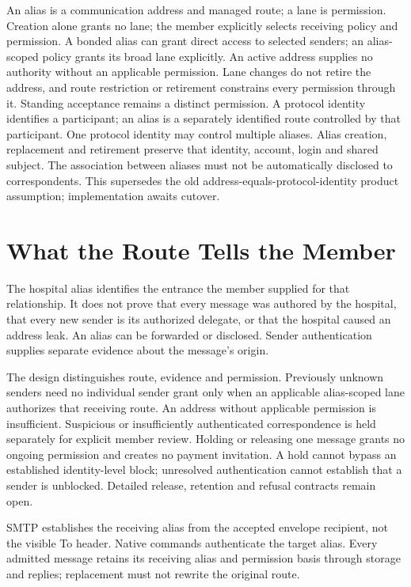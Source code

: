 \documentclass[11pt]{article}
\begin{document}
An alias is a communication address and managed route; a lane is permission.
Creation alone grants no lane; the member explicitly selects receiving policy
and permission. A bonded alias can grant direct access to selected senders;
an alias-scoped policy grants its broad lane explicitly. An active address supplies no authority
without an applicable permission. Lane changes do not retire the address, and
route restriction or retirement constrains every permission through it.
Standing acceptance remains a distinct permission. A protocol identity identifies a participant; an alias is a separately identified
route controlled by that participant. One protocol identity may control multiple
aliases. Alias creation, replacement and retirement preserve that identity,
account, login and shared subject. The association between aliases must not
be automatically disclosed to correspondents. This supersedes the old
address-equals-protocol-identity product assumption; implementation awaits cutover.

\section{What the Route Tells the Member}

The hospital alias identifies the entrance the member supplied for that
relationship. It does not prove that every message was authored by the hospital,
that every new sender is its authorized delegate, or that the hospital caused an
address leak. An alias can be forwarded or disclosed. Sender authentication
supplies separate evidence about the message's origin.

The design distinguishes route, evidence and permission. Previously unknown
senders need no individual sender grant only when an applicable alias-scoped
lane authorizes that receiving route. An address without applicable permission is insufficient.
Suspicious or insufficiently authenticated correspondence is held separately for
explicit member review. Holding or releasing one message grants no ongoing
permission and creates no payment invitation. A hold cannot bypass an established
identity-level block; unresolved authentication cannot establish that a sender is
unblocked. Detailed release, retention and refusal contracts remain open.

SMTP establishes the receiving alias from the accepted envelope recipient, not
the visible To header. Native commands authenticate the target alias. Every
admitted message retains its receiving alias and permission basis through storage
and replies; replacement must not rewrite the original route.
\end{document}
